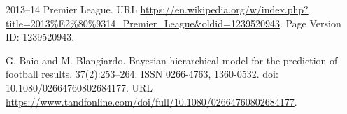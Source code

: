\documentclass{article}
\begin{document}
\begin{thebibliography}{99}
 2013–14 Premier League. URL \url{https://en.wikipedia.org/w/index.php?title=2013%E2%80%9314_Premier_League&oldid=1239520943}. Page Version ID: 1239520943.

 G. Baio and M. Blangiardo. Bayesian hierarchical model for the prediction of football results. 37(2):253–264. ISSN 0266-4763, 1360-0532. doi: 10.1080/02664760802684177. URL \url{https://www.tandfonline.com/doi/full/10.1080/02664760802684177}.
\end{thebibliography}
\end{document}
